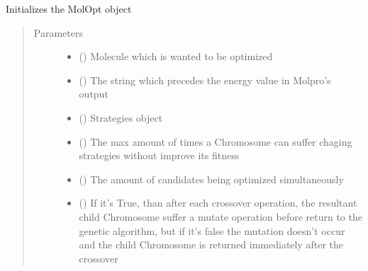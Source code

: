 \documentclass[letterpaper,10pt,english]{sphinxmanual}
\begin{document}
\begin{fulllineitems}
\sphinxAtStartPar
Initializes the MolOpt object
\begin{quote}\begin{description}
\item[{Parameters}] \leavevmode\begin{itemize}
\item {} 
\sphinxAtStartPar
{} ({\hyperref[\detokenize{molecular:molecular.Molecule}]{}}) \textendash{} Molecule which is wanted to be optimized

\item {} 
\sphinxAtStartPar
{} () \textendash{} The string which precedes the energy value in Molpro’s output

\item {} 
\sphinxAtStartPar
{} ({\hyperref[\detokenize{genetic:genetic.Strategies}]{}}) \textendash{} Strategies object

\item {} 
\sphinxAtStartPar
{} () \textendash{} The max amount of times a Chromosome can suffer chaging strategies without improve its fitness

\item {} 
\sphinxAtStartPar
{} () \textendash{} The amount of candidates being optimized simultaneously

\item {} 
\sphinxAtStartPar
{} () \textendash{} If it’s True, than after each crossover operation, the resultant child Chromosome
suffer a mutate operation before return to the genetic algorithm, but if it’s false the mutation doesn’t
occur and the child Chromosome is returned immediately after the crossover


\end{itemize}
\end{description}
\end{quote}
\end{fulllineitems}
\end{document}
